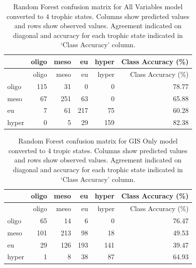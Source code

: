 \documentclass[12pt,]{article}
\begin{document}
\newpage

\begin{longtable}[c]{@{}lrrrrr@{}}
\caption{Random Forest confusion matrix for All Variables model
converted to 4 trophic states. Columns show predicted values and rows
show observed values. Agreement indicated on diagonal and accuracy for
each trophic state indicated in `Class Accuracy' column.
\label{tab:Confusion_All_4}}\tabularnewline
\toprule
& oligo & meso & eu & hyper & Class Accuracy (\%)\tabularnewline
\midrule
\endfirsthead
\toprule
& oligo & meso & eu & hyper & Class Accuracy (\%)\tabularnewline
\midrule
\endhead
oligo & 115 & 31 & 0 & 0 & 78.77\tabularnewline
meso & 67 & 251 & 63 & 0 & 65.88\tabularnewline
eu & 7 & 61 & 217 & 75 & 60.28\tabularnewline
hyper & 0 & 5 & 29 & 159 & 82.38\tabularnewline
\bottomrule
\end{longtable}

\newpage

\begin{longtable}[c]{@{}lrrrrr@{}}
\caption{Random Forest confusion matrix for GIS Only model converted to
4 tropic states. Columns show predicted values and rows show observed
values. Agreement indicated on diagonal and accuracy for each trophic
state indicated in `Class Accuracy' column.
\label{tab:Confusion_GIS_4}}\tabularnewline
\toprule
& oligo & meso & eu & hyper & Class Accuracy (\%)\tabularnewline
\midrule
\endfirsthead
\toprule
& oligo & meso & eu & hyper & Class Accuracy (\%)\tabularnewline
\midrule
\endhead
oligo & 65 & 14 & 6 & 0 & 76.47\tabularnewline
meso & 101 & 213 & 98 & 18 & 49.53\tabularnewline
eu & 29 & 126 & 193 & 141 & 39.47\tabularnewline
hyper & 1 & 8 & 38 & 87 & 64.93\tabularnewline
\bottomrule
\end{longtable}

\newpage
\end{document}
